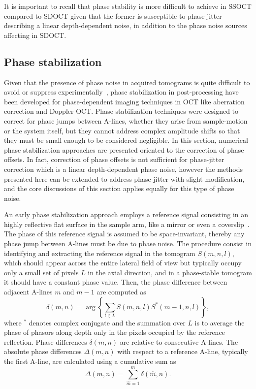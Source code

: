 It is important to recall that phase stability is more difficult to achieve in SSOCT compared to SDOCT given that the former is susceptible to phase-jitter describing a linear depth-dependent noise, in addition to the phase noise sources affecting in SDOCT.

\FloatBarrier

\subsection{Phase stabilization}\label{sec:phaseStabilization}

Given that the presence of phase noise in acquired tomograms is quite difficult to avoid or suppress experimentally~\cite{Adie2015_Interferometric}, phase stabilization in post-processing have been developed for phase-dependent imaging techniques in OCT like aberration correction and Doppler OCT. Phase stabilization techniques were designed to correct for phase jumps between A-lines, whether they arise from sample-motion or the system itself, but they cannot address complex amplitude shifts so that they must be small enough to be considered negligible. In this section, numerical phase stabilization approaches are presented oriented to the correction of phase offsets. In fact, correction of phase offsets is not sufficient for phase-jitter correction which is a linear depth-dependent phase noise, however the methods presented here can be extended to address phase-jitter with slight modification, and the core discussions of this section applies equally for this type of phase noise.

An early phase stabilization approach employs a reference signal consisting in an highly reflective flat surface in the sample arm, like a mirror or even a coverslip~\cite{Ralston2006_Phase, Yang2001_Phasereferenced}. The phase of this reference signal is assumed to be space-invariant, thereby any phase jump between A-lines must be due to phase noise. The procedure consist in identifying and extracting the reference signal in the tomogram $S(m,n,l)$, which should appear across the entire lateral field of view but typically occupy only a small set of pixels $L$ in the axial direction, and in a phase-stable tomogram it should have a constant phase value. Then, the phase difference between adjacent A-lines $m$ and $m-1$ are computed as
\begin{equation}\label{eq:PhaseDiff}
	\delta(m,n) = \arg\left\{\sum_{l\in L} S(m,n,l)S^*(m-1,n,l)\right\},
\end{equation}
where $^*$ denotes complex conjugate and the summation over $L$ is to average the phase of phasors along depth only in the pixels occupied by the reference reflection. Phase differences $\delta(m,n)$ are relative to consecutive A-lines. The absolute phase differences $\Delta(m,n)$ with respect to a reference A-line, typically the first A-line, are calculated using a cumulative sum as
\begin{equation} \label{eq:absPhaseDiff}
	\Delta(m,n) = \sum_{\hat{m}=1}^m \delta(\hat{m},n).
\end{equation}

